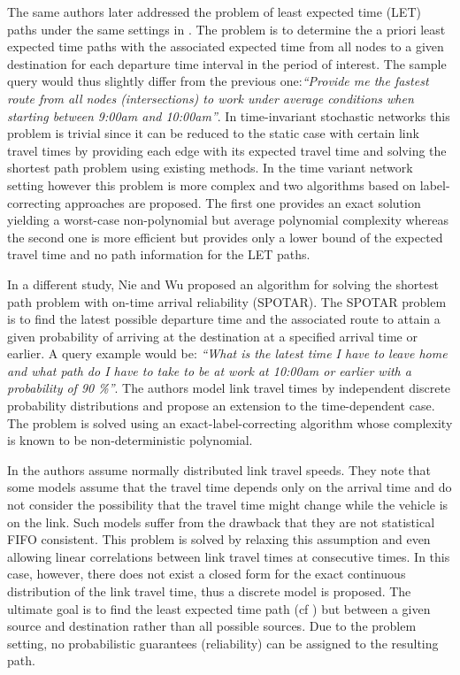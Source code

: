 The same authors later addressed the problem of least expected
time (LET) paths under the same settings in \cite{MilMah00}. The problem is to
determine the a priori least expected time paths with the associated expected time from all nodes to
a given destination for each departure time interval
in the period of interest. The sample query would thus slightly differ from the
previous one:\textit{``Provide me the fastest route from all nodes
(intersections) to work under average conditions when starting between 9:00am
and 10:00am''}. In time-invariant stochastic networks this
problem is trivial since it can be reduced to the static case with certain link
travel times by providing each edge with its expected travel time and solving
the shortest path problem using existing methods. In the time variant network
setting however this problem is more complex and two algorithms based on
label-correcting approaches are proposed. The first one provides an exact
solution yielding a worst-case non-polynomial but average polynomial complexity
whereas the second one is more efficient but provides only a lower bound of the
expected travel time and no path information for the LET paths.

In a different study, Nie and Wu \cite{NieWu09} proposed an algorithm for
solving the shortest path problem with on-time arrival reliability (SPOTAR). The SPOTAR problem is to
find the latest possible departure time and the associated route to attain a
given probability of arriving at the destination at a specified arrival time or
earlier. A query example would be: \textit{``What is the latest time I have to
leave home and what path do I have to take to be at work at 10:00am or earlier
with a probability of 90 \%''}. The authors model link travel times by independent
discrete probability distributions and propose an extension to the time-dependent case.
The problem is solved using an exact-label-correcting algorithm whose complexity
is known to be non-deterministic polynomial.

In \cite{CheLamLiSumYan13} the authors assume normally distributed link
travel speeds. They note that some models assume that the travel time depends only
on the arrival time and do not consider the possibility that the travel time might change while the vehicle is on the link. Such models suffer from the drawback that they are not
statistical FIFO consistent. This problem is solved by relaxing this assumption and even allowing
linear correlations between link travel times at consecutive times. In this
case, however, there does not exist a closed form for the exact continuous
distribution of the link travel time, thus a discrete model is proposed. The
ultimate goal is to find the least expected time path (cf \cite{MilMah00})
but between a given source and destination rather than all possible sources. Due
to the problem setting, no probabilistic guarantees (reliability) can be assigned to the resulting path.


